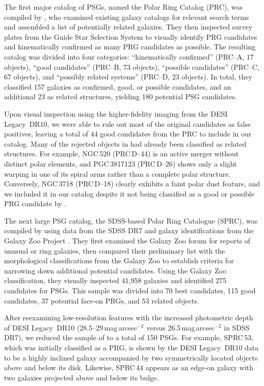 \documentclass{aa}
\begin{document}
The first major catalog of PSGs, named the Polar Ring Catalog (PRC), was compiled by \citet{1990AJ....100.1489W}, who examined existing galaxy catalogs for relevant search terms and assembled a list of potentially related galaxies. They then inspected survey plates from the Guide Star Selection System to visually identify PRG candidates and kinematically confirmed as many PRG candidates as possible. The resulting catalog was divided into four categories: ``kinematically confirmed'' (PRC--A, 17 objects), ``good candidates'' (PRC--B, 73 objects), ``possible candidates'' (PRC--C, 67 objects), and ``possibly related systems'' (PRC--D, 23 objects). In total, they classified 157 galaxies as confirmed, good, or possible candidates, and an additional 23 as related structures, yielding 180 potential PSG candidates.  

Upon visual inspection using the higher-fidelity imaging from the DESI Legacy~DR10, we were able to rule out most of the original candidates as false positives, leaving a total of 44 good candidates from the PRC to include in our catalog. Many of the rejected objects in \citet{1990AJ....100.1489W} had already been classified as related structures. For example, NGC\,520 (PRC\,D--44) is an active merger without distinct polar elements, and PGC\,3817123 (PRC\,D--26) shows only a slight warping in one of its spiral arms rather than a complete polar structure. Conversely, NGC\,3718 (PRC\,D--18) clearly exhibits a faint polar dust feature, and we included it in our catalog despite it not being classified as a good or possible PRG candidate by \citet{1990AJ....100.1489W}.

The next large PSG catalog, the SDSS-based Polar Ring Catalogue (SPRC), was compiled by \citet{2011MNRAS.418..244M} using data from the SDSS DR7 \citep{2009ApJS..182..543A} and galaxy identifications from the Galaxy Zoo Project \citep{2011MNRAS.410..166L}. They first examined the Galaxy Zoo forum for reports of unusual or ring galaxies, then compared their preliminary list with the morphological classifications from the Galaxy Zoo to establish criteria for narrowing down additional potential candidates. Using the Galaxy Zoo classification, they visually inspected 41,958 galaxies and identified 275 candidates for PSGs. This sample was divided into 70 best candidates, 115 good candidates, 37 potential face-on PRGs, and 53 related objects.  

After reexamining low-resolution features with the increased photometric depth of DESI Legacy~DR10 (28.5--29\,mag\,arcsec$^{-2}$ versus 26.5\,mag\,arcsec$^{-2}$ in SDSS DR7), we reduced the sample of \citet{2011MNRAS.418..244M} to a total of 150 PSGs. For example, SPRC\,53, which was initially classified as a PRG, is shown by the DESI Legacy~DR10 data to be a highly inclined galaxy accompanied by two symmetrically located objects above and below its disk. Likewise, SPRC\,44 appears as an edge-on galaxy with two galaxies projected above and below its bulge.
\end{document}
